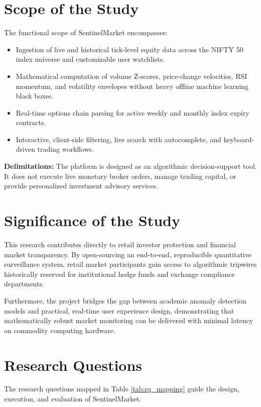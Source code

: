 \section{Scope of the Study}
The functional scope of SentinelMarket encompasses:
\begin{itemize}
    \item Ingestion of live and historical tick-level equity data across the NIFTY 50 index universe and customizable user watchlists.
    \item Mathematical computation of volume Z-scores, price-change velocities, RSI momentum, and volatility envelopes without heavy offline machine learning black boxes.
    \item Real-time options chain parsing for active weekly and monthly index expiry contracts.
    \item Interactive, client-side filtering, live search with autocomplete, and keyboard-driven trading workflows.
\end{itemize}

\noindent \textbf{Delimitations:} The platform is designed as an algorithmic decision-support tool. It does not execute live monetary broker orders, manage trading capital, or provide personalized investment advisory services.

\section{Significance of the Study}
This research contributes directly to retail investor protection and financial market transparency. By open-sourcing an end-to-end, reproducible quantitative surveillance system, retail market participants gain access to algorithmic tripwires historically reserved for institutional hedge funds and exchange compliance departments. 

Furthermore, the project bridges the gap between academic anomaly detection models and practical, real-time user experience design, demonstrating that mathematically robust market monitoring can be delivered with minimal latency on commodity computing hardware.

\section{Research Questions}
The research questions mapped in Table \ref{tab:rq_mapping} guide the design, execution, and evaluation of SentinelMarket.

